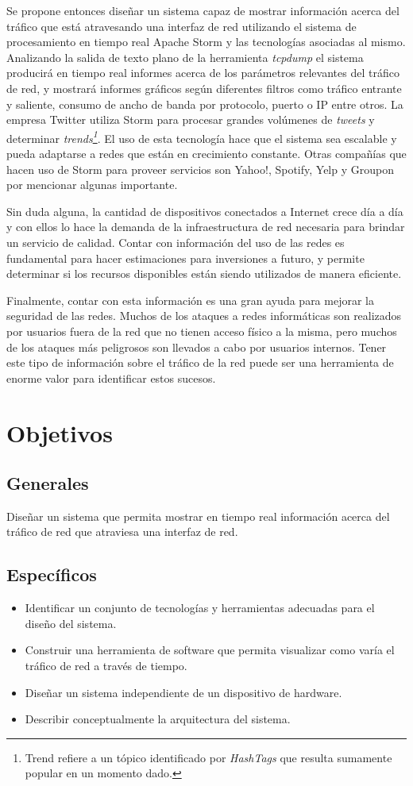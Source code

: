 Se propone entonces diseñar un sistema capaz de mostrar información acerca del tráfico que está atravesando una interfaz de red utilizando el sistema de procesamiento en tiempo real Apache Storm y las tecnologías asociadas al mismo. Analizando la salida de texto plano de la herramienta \textit{tcpdump} el sistema producirá en tiempo real informes acerca de los parámetros relevantes del tráfico de red, y mostrará informes gráficos según diferentes filtros como tráfico entrante y saliente, consumo de ancho de banda por protocolo, puerto o IP entre otros.
La empresa Twitter utiliza Storm para procesar grandes volúmenes de \textit{tweets} y determinar \textit{trends\footnote{Trend refiere a un tópico identificado por \textit{HashTags} que resulta sumamente popular en un momento dado.}}. El uso de esta tecnología hace que el sistema sea escalable y pueda adaptarse a redes que están en crecimiento constante. Otras compañías que hacen uso de Storm para proveer servicios son Yahoo!, Spotify, Yelp y Groupon por mencionar algunas importante.

Sin duda alguna, la cantidad de dispositivos conectados a Internet crece día a día y con ellos lo hace la demanda de la infraestructura de red necesaria para brindar un servicio de calidad. Contar con información del uso de las redes es fundamental para hacer estimaciones para inversiones a futuro, y permite determinar si los recursos disponibles están siendo utilizados de manera eficiente.

Finalmente, contar con esta información es una gran ayuda para mejorar la seguridad de las redes. Muchos de los ataques a redes informáticas son realizados por usuarios fuera de la red que no tienen acceso físico a la misma, pero muchos de los ataques más peligrosos son llevados a cabo por usuarios internos. Tener este tipo de información sobre el tráfico de la red puede ser una herramienta de enorme valor para identificar estos sucesos.

\section*{Objetivos}
\subsection*{Generales}
Diseñar un sistema que permita mostrar en tiempo real información acerca del tráfico de red que atraviesa una interfaz de red.
\subsection*{Específicos}
\begin{itemize}
\item Identificar un conjunto de tecnologías y herramientas adecuadas para el diseño del sistema.
\item Construir una herramienta de software que permita visualizar como varía el tráfico de red a través de tiempo.
\item Diseñar un sistema independiente de un dispositivo de hardware.
\item Describir conceptualmente la arquitectura del sistema.
\end{itemize}

